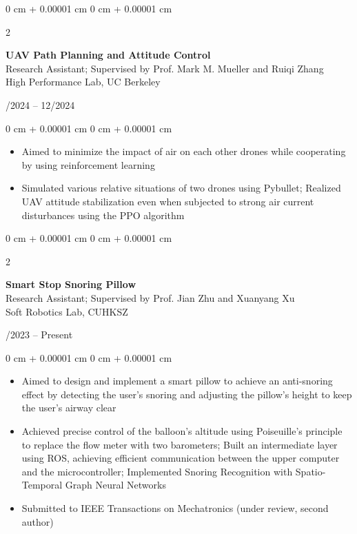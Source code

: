 \documentclass[10pt, letterpaper]{article}
\newenvironment{highlights}{
    \begin{itemize}[
        topsep=0.10 cm,
        parsep=0.10 cm,
        partopsep=0pt,
        itemsep=0pt,
        leftmargin=0 cm + 10pt
    ]
}{
    \end{itemize}
} %
\newenvironment{onecolentry}{
    \begin{adjustwidth}{
        0 cm + 0.00001 cm
    }{
        0 cm + 0.00001 cm
    }
}{
    \end{adjustwidth}
} %
\newenvironment{twocolentry}[2][]{
    \onecolentry
    \def\secondColumn{#2}
    \setcolumnwidth{\fill, 4.5 cm}
    \begin{paracol}{2}
}{
    \switchcolumn \raggedleft \secondColumn
    \end{paracol}
    \endonecolentry
} %
\begin{document}
        \vspace{0.2 cm}

        \begin{twocolentry}{
            09/2024 -- 12/2024
        }
            \textbf{UAV Path Planning and Attitude Control}\\
            Research Assistant; Supervised by Prof. Mark M. Mueller and Ruiqi Zhang\\
            High Performance Lab, UC Berkeley
        \end{twocolentry}

        \vspace{0.10 cm}
        \begin{onecolentry}
            \begin{highlights}
                \item Aimed to minimize the impact of air on each other drones while cooperating by using reinforcement learning
                \item Simulated various relative situations of two drones using Pybullet; Realized UAV attitude stabilization even when subjected to strong air current disturbances using the PPO algorithm
            \end{highlights}
        \end{onecolentry}

        \vspace{0.2 cm}

        \begin{twocolentry}{
            09/2023 -- Present
        }
            \textbf{Smart Stop Snoring Pillow}\\
            Research Assistant; Supervised by Prof. Jian Zhu and Xuanyang Xu\\
            Soft Robotics Lab, CUHKSZ
        \end{twocolentry}

        \vspace{0.10 cm}
        \begin{onecolentry}
            \begin{highlights}
                \item Aimed to design and implement a smart pillow to achieve an anti-snoring effect by detecting the user's snoring and adjusting the pillow's height to keep the user's airway clear
                \item Achieved precise control of the balloon's altitude using Poiseuille's principle to replace the flow meter with two barometers; Built an intermediate layer using ROS, achieving efficient communication between the upper computer and the microcontroller; Implemented Snoring Recognition with Spatio-Temporal Graph Neural Networks
                \item Submitted to IEEE Transactions on Mechatronics (under review, second author)
            \end{highlights}
        \end{onecolentry}
\end{document}

